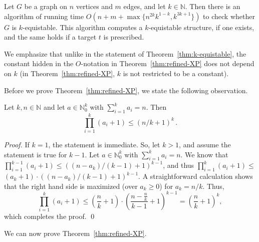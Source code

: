 \documentclass{llncs}
\begin{document}
\begin{theorem}\label{thm:refined-XP}
Let $G$ be a graph on $n$ vertices and $m$ edges, and let $k \in \mathbb N$.
Then there is an algorithm of running time
$O(n+m+\max\{n^{2k}k^{1-k},k^{3k+1}\})$
to check whether $G$ is $k$-equistable.
This algorithm computes a $k$-equistable structure, if one exists, and the same holds if a target $t$ is prescribed.
\end{theorem}

We emphasize that unlike in the statement of Theorem~\ref{thm:k-equistable}, the constant hidden in the $O$-notation
in Theorem~\ref{thm:refined-XP} does not depend on $k$ (in Theorem~\ref{thm:refined-XP}, $k$ is not restricted to be a constant).

Before we prove Theorem~\ref{thm:refined-XP}, we state the following observation.

\begin{lemma}\label{lem:technicalbound}
Let $k,n \in \mathbb N$ and let $a \in \mathbb N_0^k$ with $\sum_{i=1}^k a_i = n$.
Then $$\prod_{i=1}^k (a_i+1) \le (n/k+1)^k\,.$$
\end{lemma}

\begin{sloppypar}
\begin{proof}
If $k=1$, the statement is immediate.
So, let $k > 1$, and assume the statement is true for $k-1$.
Let $a \in \mathbb N_0^k$ with $\sum_{i=1}^k a_i = n$.
We know that $\prod_{i=1}^{k-1} (a_i+1) \le  ((n-a_k)/(k-1)+1)^{k-1}$,
and thus \hbox{$\prod_{i=1}^{k} (a_i+1) \le{}$} \hbox{$(a_k+1) \cdot ((n-a_k)/(k-1)+1)^{k-1}$}.
A straightforward calculation shows that the right hand side is maximized (over $a_k\ge 0$)
for $a_k = n/k$.
Thus,
\[
\prod_{i=1}^{k} (a_i+1) \le \left(\frac{n}{k}+1\right) \cdot \left(\frac{n-\frac{n}{k}}{k-1}+1\right)^{k-1}=\left(\frac{n}{k}+1\right)^k,
\]
which completes the proof.
\qed \end{proof}
\end    {sloppypar}

We can now prove Theorem~\ref{thm:refined-XP}.
\end{document}
